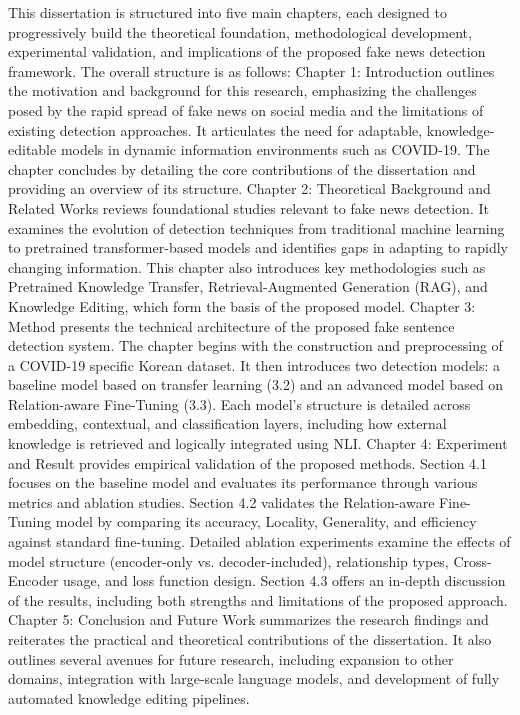 \documentclass[a4paper,fleqn]{cas-sc}
\begin{document}
This dissertation is structured into five main chapters, each designed to progressively build the theoretical foundation, methodological development, experimental validation, and implications of the proposed fake news detection framework. The overall structure is as follows:
Chapter 1: Introduction outlines the motivation and background for this research, emphasizing the challenges posed by the rapid spread of fake news on social media and the limitations of existing detection approaches. It articulates the need for adaptable, knowledge-editable models in dynamic information environments such as COVID-19. The chapter concludes by detailing the core contributions of the dissertation and providing an overview of its structure.
Chapter 2: Theoretical Background and Related Works reviews foundational studies relevant to fake news detection. It examines the evolution of detection techniques from traditional machine learning to pretrained transformer-based models and identifies gaps in adapting to rapidly changing information. This chapter also introduces key methodologies such as Pretrained Knowledge Transfer, Retrieval-Augmented Generation (RAG), and Knowledge Editing, which form the basis of the proposed model.
Chapter 3: Method presents the technical architecture of the proposed fake sentence detection system. The chapter begins with the construction and preprocessing of a COVID-19 specific Korean dataset. It then introduces two detection models: a baseline model based on transfer learning (3.2) and an advanced model based on Relation-aware Fine-Tuning (3.3). Each model’s structure is detailed across embedding, contextual, and classification layers, including how external knowledge is retrieved and logically integrated using NLI.
Chapter 4: Experiment and Result provides empirical validation of the proposed methods. Section 4.1 focuses on the baseline model and evaluates its performance through various metrics and ablation studies. Section 4.2 validates the Relation-aware Fine-Tuning model by comparing its accuracy, Locality, Generality, and efficiency against standard fine-tuning. Detailed ablation experiments examine the effects of model structure (encoder-only vs. decoder-included), relationship types, Cross-Encoder usage, and loss function design. Section 4.3 offers an in-depth discussion of the results, including both strengths and limitations of the proposed approach.
Chapter 5: Conclusion and Future Work summarizes the research findings and reiterates the practical and theoretical contributions of the dissertation. It also outlines several avenues for future research, including expansion to other domains, integration with large-scale language models, and development of fully automated knowledge editing pipelines.
\end{document}
